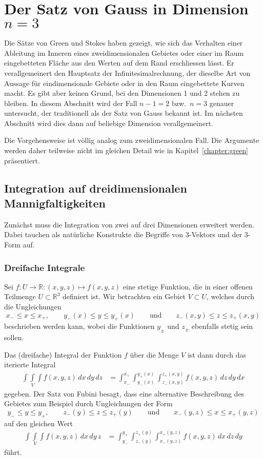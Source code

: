 %
%
\section{Der Satz von Gauss in Dimension $n=3$
\label{buch:gauss:section:dimension3}}
Die Sätze von Green und Stokes haben gezeigt, wie sich das Verhalten
einer Ableitung im Inneren eines zweidimensionalen Gebietes oder
einer im Raum eingebetteten Fläche aus den Werten auf dem Rand erschliessen
lässt.
Er verallgemeinert den Hauptsatz der Infinitesimalrechnung, der dieselbe
Art von Aussage für eindimensionale Gebiete oder in den Raum eingebettete
Kurven macht.
Es gibt aber keinen Grund, bei den Dimensionen 1 und 2 stehen zu bleiben.
In diesem Abschnitt wird der Fall $n-1=2$ bzw.~$n=3$ genauer untersucht,
der traditionell als der Satz von Gauss bekannt ist.
Im nächsten Abschnitt wird dies dann auf beliebige Dimension verallgemeinert.

Die Vorgehensweise ist völlig analog zum zweidimensionalen Fall.
Die Argumente werden daher teilweise nicht im gleichen Detail
wie in Kapitel~\ref{chapter:green} präsentiert.

%
%
\subsection{Integration auf dreidimensionalen Mannigfaltigkeiten}
Zunächst muss die Integration von zwei auf drei Dimensionen erweitert
werden.
Dabei tauchen als natürliche Konstrukte die Begriffe von 3-Vektors und
der 3-Form auf.

%
%
\subsubsection{Dreifache Integrale}
Sei $f\colon U\to\mathbb{R}:(x,y,z)\mapsto f(x,y,z)$ eine
stetige Funktion, die in einer offenen Teilmenge $U\subset\mathbb{R}^3$
definiert ist.
Wir betrachten ein Gebiet $V\subset U$, welches
durch die Ungleichungen
\[
x_-\le x \le x_+,
\qquad
y_-(x)\le y\le y_+(x)
\qquad\text{und}\qquad
z_-(x,y)\le z\le z_+(x,y)
\]
beschrieben werden kann, wobei die Funktionen $y_{\pm}$ und $z_{\pm}$
ebenfalls stetig sein sollen.

Das (dreifache) Integral der Funktion $f$ über die Menge $V$ ist dann durch 
das iterierte Integral
\begin{align}
\underset{V}{\int\!\!\!\int\!\!\!\int}
f(x,y,z)\,dx\,dy\,dz
&=
\int_{x_-}^{x_+}
\int_{y_-(x)}^{y_+(x)}
\int_{z_-(x,y)}^{z_+(x,y)}
f(x,y,z)
\,dz
\,dy
\,dx
\label{buch:gauss:3d:eqn:integral}
\end{align}
gegeben.
Der Satz von Fubini besagt, dass eine alternative Beschreibung des
Gebietes zum Beispiel durch Ungleichungen der Form
\[
y_-\le y \le y_+,
\qquad
z_-(y)\le z\le z_+(y)
\qquad\text{und}\qquad
x_-(y,z)\le x\le x_+(y,z)
\]
auf den gleichen Wert
\begin{align*}
\underset{V}{\int\!\!\!\int\!\!\!\int}
f(x,y,z)\,dx\,dy\,z
&=
\int_{y_-}^{y_+}
\int_{z_-(y)}^{z_+(y)}
\int_{x_-(y,z)}^{x_+(y,z)}
f(x,y,z)
\,dx
\,dz
\,dy
\end{align*}
führt.

